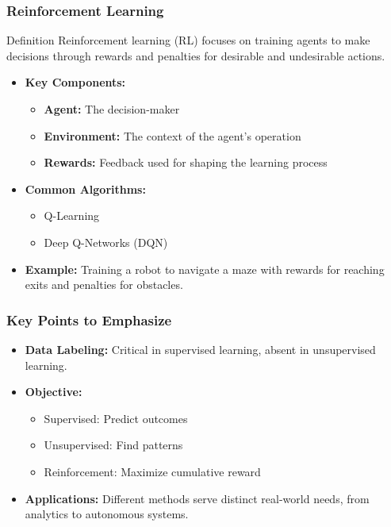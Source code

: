 \documentclass{beamer}
\begin{document}
\begin{frame}[fragile]
    \frametitle{Reinforcement Learning}
    \begin{block}{Definition}
        Reinforcement learning (RL) focuses on training agents to make decisions through rewards and penalties for desirable and undesirable actions.
    \end{block}
    
    \begin{itemize}
        \item \textbf{Key Components:}
            \begin{itemize}
                \item \textbf{Agent:} The decision-maker
                \item \textbf{Environment:} The context of the agent's operation
                \item \textbf{Rewards:} Feedback used for shaping the learning process
            \end{itemize}
        
        \item \textbf{Common Algorithms:}
            \begin{itemize}
                \item Q-Learning
                \item Deep Q-Networks (DQN)
            \end{itemize}
        
        \item \textbf{Example:} Training a robot to navigate a maze with rewards for reaching exits and penalties for obstacles.
    \end{itemize}
\end{frame}

\begin{frame}[fragile]
    \frametitle{Key Points to Emphasize}
    \begin{itemize}
        \item \textbf{Data Labeling:} Critical in supervised learning, absent in unsupervised learning.
        \item \textbf{Objective:}
            \begin{itemize}
                \item Supervised: Predict outcomes
                \item Unsupervised: Find patterns
                \item Reinforcement: Maximize cumulative reward
            \end{itemize}
        \item \textbf{Applications:} Different methods serve distinct real-world needs, from analytics to autonomous systems.
    \end{itemize}
\end{frame}
\end{document}
